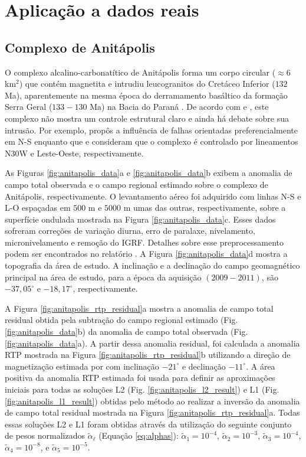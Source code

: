 \chapter{Aplicação a dados reais}


\section{Complexo de Anitápolis}
\label{subsec:anitapolis_complex}


O complexo alcalino-carbonatítico de Anitápolis forma um corpo circular 
($\approx 6$ km$^{2}$) que contém magnetita e intrudiu leucogranitos do Cretáceo Inferior ($132$ Ma), aparentemente na mesma época do derramamento basáltico da formação Serra Geral ($133-130$ Ma) na Bacia do Paraná \citep{scheibe_etal2005, gomes_etal2018}. 
De acordo com \citet{riccomini_etal2005} e \citet{gomes_etal2018}, 
este complexo não mostra um controle estrutural claro e ainda há debate sobre sua intrusão. 
Por exemplo, \citet{melcher_coutinho1966} propôs a influência de falhas orientadas preferencialmente em N-S
enquanto que \citet{horbach_marimon1980} e \citet{scheibe_etal2005} consideram que o complexo é controlado por lineamentos N30W e Leste-Oeste, respectivamente.

As Figuras \ref{fig:anitapolis_data}a e \ref{fig:anitapolis_data}b exibem a anomalia de campo total observada e o campo regional estimado sobre o complexo de Anitápolis, respectivamente.
O levantamento aéreo foi adquirido com linhas N-S e L-O espaçadas em $500$ m e $5000$ m umas das outras, respectivamente, sobre a superfície ondulada mostrada na Figura \ref{fig:anitapolis_data}c. 
Esses dados sofreram correções de variação diurna, erro de paralaxe, nivelamento, micronivelamento e remoção do IGRF.
Detalhes sobre esse preprocessamento podem ser encontrados no relatório \cite{sc-2011}.
A Figura \ref{fig:anitapolis_data}d mostra a topografia da área de estudo.
A inclinação e a declinação do campo geomagnético principal na área de estudo, para a época da aquisição $(2009-2011)$, são $-37,05^{\circ}$ e 
$-18,17^{\circ}$, respectivamente.

A Figura \ref{fig:anitapolis_rtp_residual}a mostra a anomalia de campo total residual obtida pela subtração do campo regional estimado (Fig. \ref{fig:anitapolis_data}b)
da anomalia de campo total observada (Fig. \ref{fig:anitapolis_data}a).
A partir dessa anomalia residual, foi calculada a anomalia RTP mostrada na Figura \ref{fig:anitapolis_rtp_residual}b utilizando a direção de magnetização estimada por \citet{reis_etal2019} com inclinação $-21^{\circ}$ e declinação $-11^{\circ}$.
A área positiva da anomalia RTP estimada foi usada para definir as aproximações iniciais para todas as soluções L2 (Fig. \ref{fig:anitapolis_l2_result}) e L1 
(Fig. \ref{fig:anitapolis_l1_result}) obtidas pelo método ao realizar a inversão da anomalia de campo total residual mostrada na Figura \ref{fig:anitapolis_rtp_residual}a.
Todas essas soluções L2 e L1 foram obtidas através da utilização do seguinte conjunto de pesos normalizados $\tilde{\alpha}_{\ell}$ (Equação \ref{eq:alphas}):
$\tilde{\alpha}_{1} = 10^{-4}$, $\tilde{\alpha}_{2} = 10^{-3}$, 
$\tilde{\alpha}_{3} = 10^{-4}$, $\tilde{\alpha}_{4} = 10^{-8}$, e 
$\tilde{\alpha}_{5} = 10^{-5}$.

